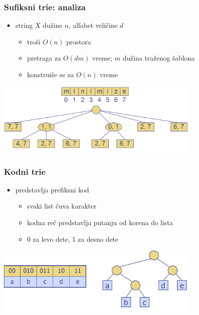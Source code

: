 \documentclass[compress]{beamer}
\begin{document}
\begin{frame}[fragile]
  \frametitle{Sufiksni trie: analiza}
  \begin{itemize}
    \item string $X$ dužine $n$, alfabet veličine $d$
    \begin{itemize}
      \item troši $O(n)$ prostora
      \item pretraga za $O(dm)$ vreme; $m$ dužina traženog šablona
      \item konstruiše se za $O(n)$ vreme
    \end{itemize}
  \end{itemize}
  \begin{center}
    \includegraphics[width=10cm]{asp-13-pic25.png}
  \end{center}
\end{frame}

\begin{frame}[fragile]
  \frametitle{Kodni trie}
  \begin{itemize}
    \item {} predstavlja prefiksni kod
    \begin{itemize}
      \item svaki list čuva karakter
      \item kodna reč predstavlja putanju od korena do lista
      \item 0 za levo dete, 1 za desno dete
    \end{itemize}
  \end{itemize}
  \begin{center}
    \includegraphics[width=10cm]{asp-13-pic26.png}
  \end{center}
\end{frame}
\end{document}
